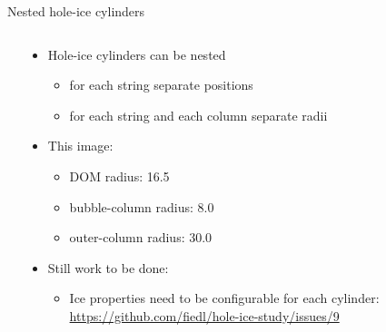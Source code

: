 
\begin{frame}[fragile]{Nested hole-ice cylinders}

  \begin{columns}
    \begin{column}{0.5\textwidth}


    \end{column}
    \begin{column}{0.5\textwidth}

      \begin{itemize}
        \item Hole-ice cylinders can be nested
          \begin{itemize}
            \item for each string separate positions
            \item for each string and each column separate radii
          \end{itemize}
        \item This image:
          \begin{itemize}
            \item DOM radius: 16.5\cm
            \item bubble-column radius: 8.0\cm
            \item outer-column radius: 30.0\cm
          \end{itemize}
        \item Still work to be done:
          \begin{itemize}
            \item Ice properties need to be configurable for each cylinder:
                \tiny \url{https://github.com/fiedl/hole-ice-study/issues/9} \small
          \end{itemize}
      \end{itemize}


    \end{column}
  \end{columns}

\end{frame}
